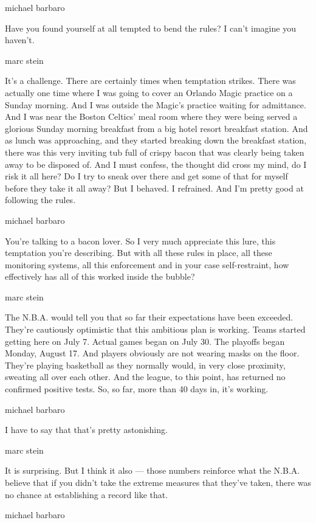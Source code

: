 michael barbaro

Have you found yourself at all tempted to bend the rules? I can't
imagine you haven't.

marc stein

It's a challenge. There are certainly times when temptation strikes.
There was actually one time where I was going to cover an Orlando Magic
practice on a Sunday morning. And I was outside the Magic's practice
waiting for admittance. And I was near the Boston Celtics' meal room
where they were being served a glorious Sunday morning breakfast from a
big hotel resort breakfast station. And as lunch was approaching, and
they started breaking down the breakfast station, there was this very
inviting tub full of crispy bacon that was clearly being taken away to
be disposed of. And I must confess, the thought did cross my mind, do I
risk it all here? Do I try to sneak over there and get some of that for
myself before they take it all away? But I behaved. I refrained. And I'm
pretty good at following the rules.

michael barbaro

You're talking to a bacon lover. So I very much appreciate this lure,
this temptation you're describing. But with all these rules in place,
all these monitoring systems, all this enforcement and in your case
self-restraint, how effectively has all of this worked inside the
bubble?

marc stein

The N.B.A. would tell you that so far their expectations have been
exceeded. They're cautiously optimistic that this ambitious plan is
working. Teams started getting here on July 7. Actual games began on
July 30. The playoffs began Monday, August 17. And players obviously are
not wearing masks on the floor. They're playing basketball as they
normally would, in very close proximity, sweating all over each other.
And the league, to this point, has returned no confirmed positive tests.
So, so far, more than 40 days in, it's working.

michael barbaro

I have to say that that's pretty astonishing.

marc stein

It is surprising. But I think it also --- those numbers reinforce what
the N.B.A. believe that if you didn't take the extreme measures that
they've taken, there was no chance at establishing a record like that.

michael barbaro

